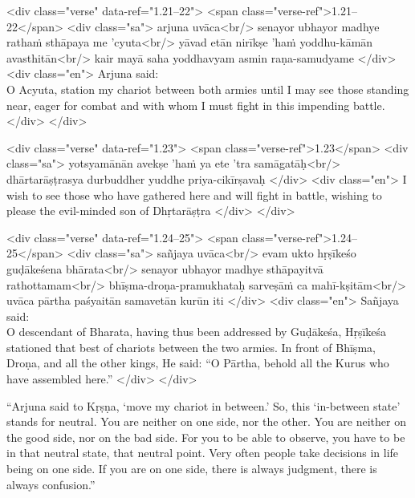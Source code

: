 \begin{html}
<div class="verse" data-ref="1.21–22">
  <span class="verse-ref">1.21–22</span>
  <div class="sa">
    arjuna uvāca<br/>
    senayor ubhayor madhye rathaṁ sthāpaya me ’cyuta<br/>
    yāvad etān nirīkṣe ’haṁ yoddhu-kāmān avasthitān<br/>
    kair mayā saha yoddhavyam asmin raṇa-samudyame
  </div>
  <div class="en">
    \hspace*{1em}Arjuna said: \\ O Acyuta, station my chariot between both armies until I may see those standing near, eager for combat and with whom I must fight in this impending battle.
  </div>
</div>
\end{html}



\begin{html}
<div class="verse" data-ref="1.23">
  <span class="verse-ref">1.23</span>
  <div class="sa">
    yotsyamānān avekṣe ’haṁ ya ete ’tra samāgatāḥ<br/>
    dhārtarāṣṭrasya durbuddher yuddhe priya-cikīrṣavaḥ
  </div>
  <div class="en">
    I wish to see those who have gathered here and will fight in battle, wishing to please the evil-minded son of Dhṛtarāṣṭra
  </div>
</div>
\end{html}



\begin{html}
<div class="verse" data-ref="1.24–25">
  <span class="verse-ref">1.24–25</span>
  <div class="sa">
    sañjaya uvāca<br/>
    evam ukto hṛṣīkeśo guḍākeśena bhārata<br/>
    senayor ubhayor madhye sthāpayitvā rathottamam<br/>
    bhīṣma-droṇa-pramukhataḥ sarveṣāṁ ca mahī-kṣitām<br/>
    uvāca pārtha paśyaitān samavetān kurūn iti
  </div>
  <div class="en">
    \hspace*{1em}Sañjaya said: \\ O descendant of Bharata, having thus been addressed by Guḍākeśa, Hṛṣīkeśa stationed that best of chariots between the two armies. In front of Bhīṣma, Droṇa, and all the other kings, He said: \enquote{O Pārtha, behold all the Kurus who have assembled here.}
  </div>
</div>
\end{html}


\enquote{Arjuna said to Kṛṣṇa, \enquote{move my chariot in between.} So, this \enquote{in-between state} stands for neutral. You are neither on one side, nor the other. You are neither on the good side, nor on the bad side. For you to be able to observe, you have to be in that neutral state, that neutral point. Very often people take decisions in life being on one side. If you are on one side, there is always judgment, there is always confusion.}

